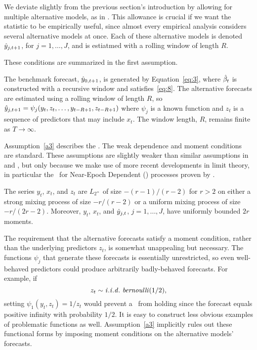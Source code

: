 \documentclass[12pt,fleqn]{article}
\begin{document}
We deviate slightly from the previous section's introduction by
allowing for multiple alternative models, as in \cite{HuW:10}. This
allowance is crucial if we want the statistic to be empirically
useful, since almost every empirical analysis considers several
alternative models at once.  Each of these alternative models is
denoted $\hat{y}_{j,t+1}$, for $j = 1,\dots,J$, and is estiatmed with a
rolling window of length $R$.

These conditions are summarized in the first assumption.

\begin{asmp}\label{a1}%
  The benchmark forecast, $\hat{y}_{0,t+1}$, is generated by
  Equation~\eqref{eq:3}, where $\hat{\beta}_t$ is constructed with a recursive
  window and satisfies~\eqref{eq:8}. The alternative forecasts are
  estimated using a rolling window of length $R$, so $\hat{y}_{j,t+1} =
  \psi_j(y_t,z_t,\dots,y_{t-R+1}, z_{t-R+1})$ where $\psi_j$ is a
  known function and $z_t$ is a sequence of predictors that may
  include $x_t$. The window length, $R$, remains finite as $T \to
  \infty$.
\end{asmp}

Assumption~\ref{a3} describes the \dgp. The weak dependence and moment
conditions are standard. These assumptions are slightly weaker than
similar assumptions in \citet{Wes:96} and \citet{Mcc:00}, but only
because we make use of more recent developments in limit theory, in
particular the \clt\ for Near-Epoch Dependent (\ned) processes proven by
\cite{Jon:97}.

\begin{asmp}\label{a3}%
  The series $y_t$, $x_t$, and $z_t$ are $L_2$-\ned\ of size
  $-(r-1)/(r-2)$ for $r > 2$ on either a strong mixing process of size
  $-r/(r-2)$ or a uniform mixing process of size
  $-r/(2r-2)$. Moreover, $y_t$, $x_t$, and $\hat{y}_{j,t}$, $j =
  1,\dots,J$, have uniformly bounded $2 r$ moments.
\end{asmp}

The requirement that the alternative forecasts satisfy a moment
condition, rather than the underlying predictors $z_t$, is somewhat
unappealing but necessary. The functions $\psi_j$ that generate these
forecasts is essentially unrestricted, so even well-behaved predictors
could produce arbitrarily badly-behaved forecasts. For example, if
\begin{equation*}
  z_t \sim \mathit{i.i.d.}~\mathit{bernoulli}(1/2),
\end{equation*}
setting $\psi_1(y_t, z_t) = 1/z_t$ would prevent a \clt\ from holding
since the forecast equals positive infinity with probability $1/2$. It
is easy to construct less obvious examples of problematic functions as
well. Assumption~\ref{a3} implicitly rules out these functional forms
by imposing moment conditions on the alternative models' forecasts.
\end{document}
